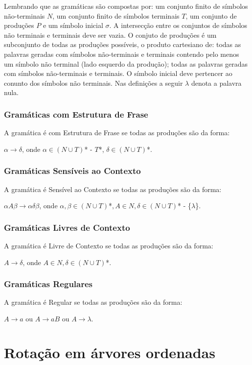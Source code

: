 Lembrando que as gramáticas são compostas por: um conjunto finito de símbolos não-terminais $N$, um conjunto finito de símbolos terminais $T$, um conjunto de produções $P$ e um símbolo inicial $\sigma$. A intersecção entre os conjuntos de símbolos não terminais e terminais deve ser vazia. O conjuto de produções é um subconjunto de todas as produções possíveis, o produto cartesiano de: todas as palavras geradas com símbolos não-terminais e terminais contendo pelo menos um símbolo não terminal (lado esquerdo da produção); todas as palavras geradas com símbolos não-terminais e terminais. O símbolo inicial deve pertencer ao conunto dos símbolos não terminais. Nas definições a seguir $\lambda$ denota a palavra nula.

\subsection{Gramáticas com Estrutura de Frase}
A gramática é com Estrutura de Frase se todas as produções são da forma:

$\alpha \to \delta$, onde $\alpha \in (N \cup T)$* - $T$*, $\delta \in (N \cup T)$*.

\subsection{Gramáticas Sensíveis ao Contexto}
A gramática é Sensível ao Contexto se todas as produções são da forma:

$\alpha A\beta \to \alpha \delta \beta$, onde $\alpha,\beta \in (N \cup T)$*$, A \in N, \delta \in (N \cup T)$* - \{$\lambda$\}.

\subsection{Gramáticas Livres de Contexto}
A gramática é Livre de Contexto se todas as produções são da forma:

$A \to \delta$, onde $A \in N, \delta \in (N \cup T)$*.

\subsection{Gramáticas Regulares}
A gramática é Regular se todas as produções são da forma:

$A \to a$ ou $A \to aB$ ou $A \to \lambda$.

\chapter{Rotação em árvores ordenadas}

